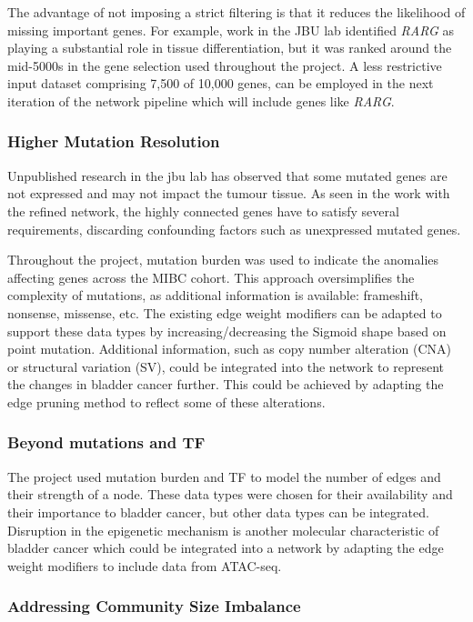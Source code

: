 The advantage of not imposing a strict filtering is that it reduces the likelihood of missing important genes. For example, work in the JBU lab identified \textit{RARG} as playing a substantial role in tissue differentiation, but it was ranked around the mid-5000s in the gene selection used throughout the project. A less restrictive input dataset comprising 7,500 of 10,000 genes, can be employed in the next iteration of the network pipeline which will include genes like \textit{RARG}.

\subsubsection*{Higher Mutation Resolution}

Unpublished research in the \acrlong{jbu} lab has observed that some mutated genes are not expressed and may not impact the tumour tissue. As seen in the work with the refined network, the highly connected genes have to satisfy several requirements, discarding confounding factors such as unexpressed mutated genes.

Throughout the project, mutation burden was used to indicate the anomalies affecting genes across the MIBC cohort. This approach oversimplifies the complexity of mutations, as additional information is available: frameshift, nonsense, missense, etc. The existing edge weight modifiers can be adapted to support these data types by increasing/decreasing the Sigmoid shape based on point mutation. Additional information, such as copy number alteration (CNA) or structural variation (SV), could be integrated into the network to represent the changes in bladder cancer further. This could be achieved by adapting the edge pruning method to reflect some of these alterations.

\subsubsection*{Beyond mutations and TF}

The project used mutation burden and TF to model the number of edges and their strength of a node. These data types were chosen for their availability and their importance to bladder cancer, but other data types can be integrated. Disruption in the epigenetic mechanism is another molecular characteristic of bladder cancer which could be integrated into a network by adapting the edge weight modifiers to include data from ATAC-seq.


\subsubsection*{Addressing Community Size Imbalance}

